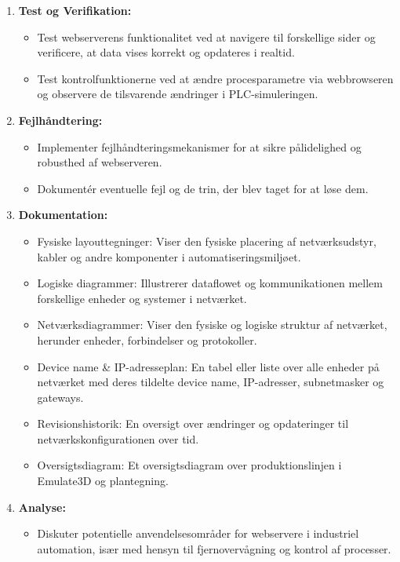 \begin{enumerate}
	\item \textbf{Test og Verifikation:}
	\begin{itemize}
		\item Test webserverens funktionalitet ved at navigere til forskellige sider og verificere, at data vises korrekt og opdateres i realtid.
		\item Test kontrolfunktionerne ved at ændre procesparametre via webbrowseren og observere de tilsvarende ændringer i PLC-simuleringen.
	\end{itemize}
	
	\item \textbf{Fejlhåndtering:}
	\begin{itemize}
		\item Implementer fejlhåndteringsmekanismer for at sikre pålidelighed og robusthed af webserveren.
		\item Dokumentér eventuelle fejl og de trin, der blev taget for at løse dem.
	\end{itemize}
	
	\item \textbf{Dokumentation:}
	\begin{itemize}
		\item Fysiske layouttegninger: Viser den fysiske placering af netværksudstyr, kabler og andre komponenter i automatiseringsmiljøet.
		\item Logiske diagrammer: Illustrerer dataflowet og kommunikationen mellem forskellige enheder og systemer i netværket.
		\item Netværksdiagrammer: Viser den fysiske og logiske struktur af netværket, herunder enheder, forbindelser og protokoller.
		\item Device name \& IP-adresseplan: En tabel eller liste over alle enheder på netværket med deres tildelte device name, IP-adresser, subnetmasker og gateways.
		\item Revisionshistorik: En oversigt over ændringer og opdateringer til netværkskonfigurationen over tid.
		\item Oversigtsdiagram: Et oversigtsdiagram over produktionslinjen i Emulate3D og plantegning.
	\end{itemize}
	
	\item \textbf{Analyse:}
	\begin{itemize}
		\item Diskuter potentielle anvendelsesområder for webservere i industriel automation, især med hensyn til fjernovervågning og kontrol af processer.
	\end{itemize}
\end{enumerate}

